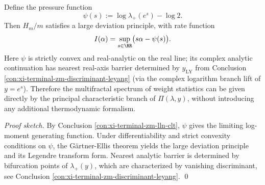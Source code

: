 \begin{conclusion}\label{con:xi-terminal-zm-ldp}
Define the pressure function
\[
\psi(s):=\log\lambda_+(e^s)-\log 2.
\]
Then \(H_m/m\) satisfies a large deviation principle, with rate function
\[
I(\alpha)=\sup_{s\in\RR}\bigl(s\alpha-\psi(s)\bigr).
\]
Here \(\psi\) is strictly convex and real-analytic on the real line;
its complex analytic continuation has nearest real-axis barrier determined by \(y_{\mathrm{LY}}\) from Conclusion \ref{con:xi-terminal-zm-discriminant-leyang} (via the complex logarithm branch lift of \(y=e^s\)).
Therefore the multifractal spectrum of weight statistics can be given directly by the principal characteristic branch of \(\Pi(\lambda,y)\), without introducing any additional thermodynamic formalism.
\end{conclusion}
\begin{proof}[Proof sketch]
By Conclusion \ref{con:xi-terminal-zm-lln-clt}, \(\psi\) gives the limiting log-moment generating function.
Under differentiability and strict convexity conditions on \(\psi\), the G\"artner-Ellis theorem yields the large deviation principle and its Legendre transform form.
Nearest analytic barrier is determined by bifurcation points of \(\lambda_+(y)\), which are characterized by vanishing discriminant, see Conclusion \ref{con:xi-terminal-zm-discriminant-leyang}. \qed
\end{proof}

